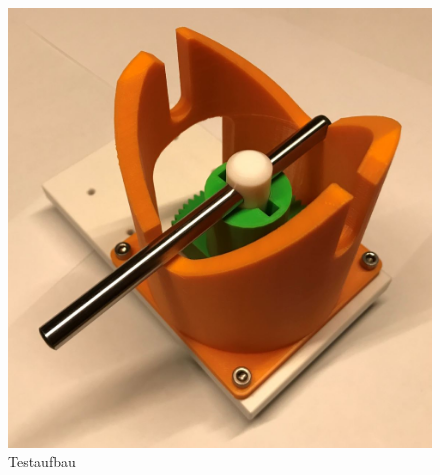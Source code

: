 \documentclass[../../main.tex]{subfiles}
\begin{document}
        \begin{figure}[H]
            \centering
            \includegraphics[width=1.0\textwidth]{../../images/Kran/Testaufbau.JPG}
            \caption {Testaufbau}
            \label{fig:et_komponenten}
        \end{figure}
\end{document}
